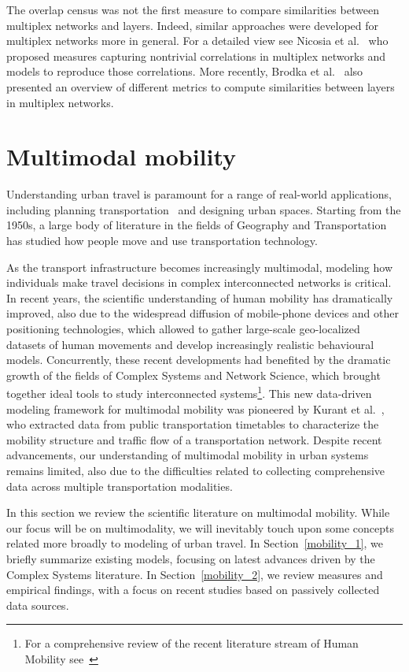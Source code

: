 The overlap census was not the first measure to compare similarities between multiplex networks and layers. Indeed, similar approaches were developed for multiplex networks more in general. For a detailed view see Nicosia et al.~\cite{nicosia2015measuring} who proposed measures capturing nontrivial correlations in multiplex networks and models to reproduce those correlations. More recently, Brodka et al.~\cite{brodka2017similarity} also presented an overview of different metrics to compute similarities between layers in multiplex networks. 


\section{Multimodal mobility}\label{sec:multimodalmobility}

Understanding urban travel is paramount for a range of real-world applications, including planning transportation~\cite{patriksson2015traffic} and designing urban spaces. Starting from the 1950s, a large body of literature in the fields of Geography and Transportation has studied how people move and use transportation technology. 

As the transport infrastructure becomes increasingly multimodal, modeling how individuals make travel decisions in complex interconnected networks is critical. In recent years, the scientific understanding of human mobility has dramatically improved, also due to the widespread diffusion of mobile-phone devices and other positioning technologies, which allowed to gather large-scale geo-localized datasets of human movements and develop increasingly realistic behavioural models. Concurrently, these recent developments had benefited by the dramatic growth of the fields of Complex Systems and Network Science, which brought together ideal tools to study interconnected systems\footnote{For a comprehensive review of the recent literature stream of Human Mobility see~\cite{barbosa2018human}}. This new data-driven modeling framework for multimodal mobility was pioneered by Kurant et al.~\cite{kurant2006extraction}, who extracted data from public transportation timetables to characterize the mobility structure and traffic flow of a transportation network. Despite recent advancements, our understanding of multimodal mobility in urban systems remains limited, also due to the difficulties related to collecting comprehensive data across multiple transportation modalities. 

In this section we review the scientific literature on multimodal mobility. While our focus will be on multimodality, we will inevitably touch upon some concepts related more broadly to modeling of urban travel. In Section~\ref{mobility_1}, we briefly summarize existing models, focusing on latest advances driven by the Complex Systems literature. In Section~\ref{mobility_2}, we review measures and empirical findings, with a focus on recent studies based on passively collected data sources. 

